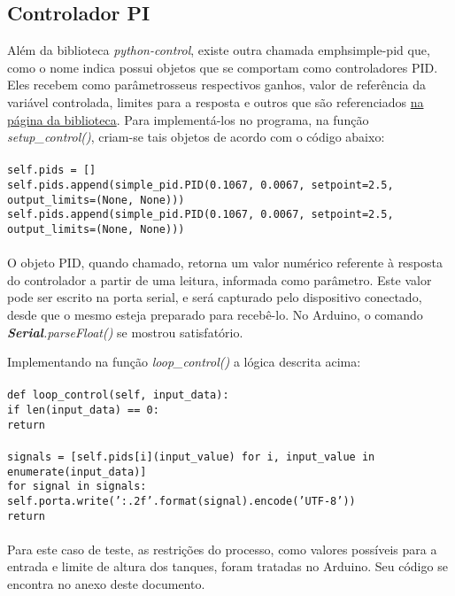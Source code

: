 \subsection{Controlador PI}

Além da biblioteca \emph{python-control}, existe outra chamada emph{simple-pid} que, como o nome indica possui objetos que se comportam como controladores PID. Eles recebem como parâmetrosseus respectivos ganhos, valor de referência da variável controlada, limites para a resposta e outros que são referenciados  \href{https://pypi.org/project/simple-pid/}{na página da biblioteca}. Para implementá-los no programa, na função \emph{setup\_control()}, criam-se tais objetos de acordo com o código abaixo:
\\\\
\texttt{\footnotesize self.pids = [] \\
	self.pids.append(simple\_pid.PID(0.1067, 0.0067, setpoint=2.5, output\_limits=(None, None))) \\
	self.pids.append(simple\_pid.PID(0.1067, 0.0067, setpoint=2.5, output\_limits=(None, None)))}
\\\\
O objeto PID, quando chamado, retorna um valor numérico referente à resposta do controlador a partir de uma leitura, informada como parâmetro. Este valor pode ser escrito na porta serial, e será capturado pelo dispositivo conectado, desde que o mesmo esteja preparado para recebê-lo. No Arduino, o comando \emph{\textbf{Serial}.parseFloat()} se mostrou satisfatório.

Implementando na função \emph{loop\_control()} a lógica descrita acima:
\\\\
\texttt{\footnotesize def loop\_control(self, input\_data): \\
	\hspace*{8mm}if len(input\_data) == 0: \\
	\hspace*{8mm}\hspace*{8mm} return \\\\
	\hspace*{8mm}signals = [self.pids[i](input\_value) for i, input\_value in enumerate(input\_data)] \\
	\hspace*{8mm}for signal in signals: \\
	\hspace*{8mm}\hspace*{8mm}self.porta.write('{:.2f}'.format(signal).encode('UTF-8')) \\
	\hspace*{8mm}return}
\\\\
Para este caso de teste, as restrições do processo, como valores possíveis para a entrada e limite de altura dos tanques, foram tratadas no Arduino. Seu código se encontra no anexo deste documento.

